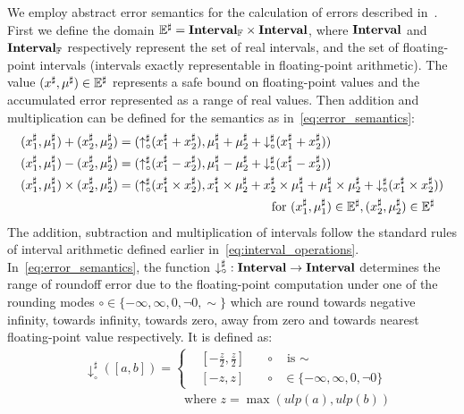 We employ abstract error semantics for the calculation of errors described
in~\cite{ioualalen, martel07}. First we define the domain $\mathbb{E}^\sharp
= \mathbf{Interval}_\mathbb{F}\times\mathbf{Interval}$, where $\mathbf{Interval}$ and
$\mathbf{Interval}_\mathbb{F}$ respectively represent the set of real intervals, and
the set of floating-point intervals (intervals exactly representable in
floating-point arithmetic). The value $(x^\sharp, \mu^\sharp) \in \mathbb{E}^\sharp$
represents a safe bound on floating-point values and the accumulated error
represented as a range of real values. Then addition and multiplication can be
defined for the semantics as in~\eqref{eq:error_semantics}:
\begin{equation}
    \begin{aligned}
        (x^\sharp_1, \mu^\sharp_1) + (x^\sharp_2, \mu^\sharp_2)
    &=  (\operatorname{\uparrow^\sharp_\circ}(x^\sharp_1 + x^\sharp_2),
         \mu^\sharp_1 + \mu^\sharp_2 +
         \operatorname{\downarrow^\sharp_\circ}(x^\sharp_1 + x^\sharp_2)) \\
        (x^\sharp_1, \mu^\sharp_1) - (x^\sharp_2, \mu^\sharp_2)
    &=  (\operatorname{\uparrow^\sharp_\circ}(x^\sharp_1 - x^\sharp_2),
         \mu^\sharp_1 - \mu^\sharp_2 +
         \operatorname{\downarrow^\sharp_\circ}(x^\sharp_1 - x^\sharp_2)) \\
        (x^\sharp_1, \mu^\sharp_1) \times (x^\sharp_2, \mu^\sharp_2)
    &=  (\operatorname{\uparrow^\sharp_\circ}(x^\sharp_1 \times x^\sharp_2),
            x^\sharp_1 \times \mu^\sharp_2 + x^\sharp_2 \times \mu^\sharp_1 +
            \mu^\sharp_1 \times \mu^\sharp_2 +
            \operatorname{\downarrow^\sharp_\circ}(x^\sharp_1 \times x^\sharp_2)) \\
    &\qquad\qquad\qquad\qquad\qquad\qquad\text{~for~}
        (x^\sharp_1, \mu^\sharp_1) \in \mathbb{E}^\sharp,
        (x^\sharp_2, \mu^\sharp_2) \in \mathbb{E}^\sharp
    \end{aligned}
    \label{eq:error_semantics}
\end{equation}
The addition, subtraction and multiplication of intervals follow the standard
rules of interval arithmetic defined earlier in~\eqref{eq:interval_operations}.
In~\eqref{eq:error_semantics}, the function $\operatorname{\downarrow^\sharp_\circ}: \mathbf{Interval} \to
\mathbf{Interval}$ determines the range of roundoff error due to the floating-point
computation under one of the rounding modes $\circ \in \{ -\infty, \infty, 0,
\neg0, \sim \}$ which are round towards negative infinity, towards infinity,
towards zero, away from zero and towards nearest floating-point value
respectively. It is defined as:
\begin{equation}
    \begin{aligned}
        & \downarrow^\sharp_\circ([a, b]) = \left\{
            \begin{aligned}
                & \left[ -\frac{z}{2}, \frac{z}{2}\right]
                    & \quad \circ & \text{~is~}\sim \\
                & \left[ -z, z\right]
                    & \quad \circ & \in \{ -\infty, \infty, 0, \neg0 \}
            \end{aligned}
        \right. \\
        & \qquad\qquad\qquad\qquad \text{where~} z = \max(ulp(a), ulp(b))
    \end{aligned}
\end{equation}
